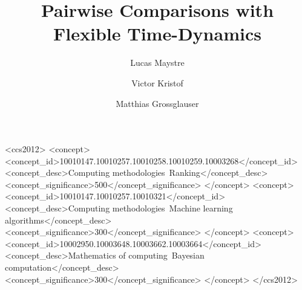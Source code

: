 \documentclass[format=sigconf]{acmart}
\begin{document}
\title{Pairwise Comparisons with Flexible Time-Dynamics}

\author{Lucas Maystre}

\author{Victor Kristof}

\author{Matthias Grossglauser}

\renewcommand{\shortauthors}{L. Maystre et al.}

\begin{abstract}
\end{abstract}

%
%
\begin{CCSXML}
	<ccs2012>
	<concept>
	<concept_id>10010147.10010257.10010258.10010259.10003268</concept_id>
	<concept_desc>Computing methodologies~Ranking</concept_desc>
	<concept_significance>500</concept_significance>
	</concept>
	<concept>
	<concept_id>10010147.10010257.10010321</concept_id>
	<concept_desc>Computing methodologies~Machine learning algorithms</concept_desc>
	<concept_significance>300</concept_significance>
	</concept>
	<concept>
	<concept_id>10002950.10003648.10003662.10003664</concept_id>
	<concept_desc>Mathematics of computing~Bayesian computation</concept_desc>
	<concept_significance>300</concept_significance>
	</concept>
	</ccs2012>
\end{CCSXML}



\maketitle

% 
% 
% 
% 
% 
% 




% 
% 
\end{document}
